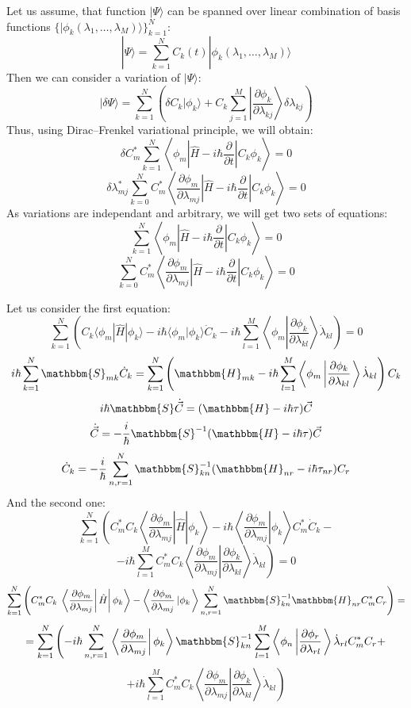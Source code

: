 Let us assume, that function $|\Psi\rangle$ can be spanned over linear combination of basis functions $\{|\phi_k(\lambda_1,\ldots,\lambda_M)\rangle\}_{k=1}^N$:
$$|\Psi\rangle = \sum_{k=1}^NC_k(t)|\phi_k(\lambda_1,\ldots,\lambda_M)\rangle$$
Then we can consider a variation of $|\Psi\rangle$:
$$|\delta\Psi\rangle = \sum_{k=1}^N \left( \delta C_k|\phi_k\rangle + %
					   C_k\sum_{j=1}^M\left|\frac{\partial\phi_k}{\partial\lambda_{kj}}\right\rangle\delta\lambda_{kj} \right)$$
Thus, using Dirac--Frenkel variational principle, we will obtain:
$$\delta C_m^*\sum_{k=1}^N\left\langle\phi_m\left|\hat{H}-i\hbar\frac{\partial}{\partial t}\right|C_k\phi_k\right\rangle=0$$
$$\delta\lambda_{mj}^*\sum_{k=0}^NC_m^*\left\langle\frac{\partial\phi_m}{\partial\lambda_{mj}}\left|\hat{H}-i\hbar\frac{\partial}{\partial t}\right|C_k\phi_k\right\rangle = 0$$
As variations are independant and arbitrary, we will get two sets of equations:
$$\sum_{k=1}^N\left\langle\phi_m\left|\hat{H}-i\hbar\frac{\partial}{\partial t}\right|C_k\phi_k\right\rangle=0$$
$$\sum_{k=0}^NC_m^*\left\langle\frac{\partial\phi_m}{\partial\lambda_{mj}}\left|\hat{H}-i\hbar\frac{\partial}{\partial t}\right|C_k\phi_k\right\rangle = 0$$

Let us consider the first equation:
$$\sum_{k=1}^N \left(C_k\langle\phi_m|\hat{H}|\phi_k\rangle - %
	       i\hbar\langle\phi_m|\phi_k\rangle \dot{C}_k - %
	       i\hbar\sum_{l=1}^M\left\langle\phi_m\left|\frac{\partial\phi_k}{\partial\lambda_{kl}}\right.\right\rangle\dot{\lambda}_{kl}\right)=0$$
$$i\hbar\sum_{k=1}^N\mathbbm{S}_{mk}\dot{C}_k=\sum_{k=1}^N\left(\mathbbm{H}_{mk}-%
							  i\hbar\sum_{l=1}^M\left\langle\phi_m\left|\frac{\partial\phi_k}{\partial\lambda_{kl}}\right.\right\rangle\dot{\lambda}_{kl}\right)C_k$$
$$i\hbar\mathbbm{S}\dot{\vec{C}}=(\mathbbm{H}-i\hbar\tau)\vec{C}$$
$$\dot{\vec{C}} = -\frac{i}{\hbar}\mathbbm{S}^{-1}(\mathbbm{H}-i\hbar\tau)\vec{C}$$
$$\dot{C}_k = -\frac{i}{\hbar}\sum_{n,r=1}^N \mathbbm{S}^{-1}_{kn}(\mathbbm{H}_{nr}-i\hbar\tau_{nr})C_r$$
And the second one:
$$\sum_{k=1}^N\left.\left.\left(C_m^*C_k\left\langle\frac{\partial\phi_m}{\partial\lambda_{mj}}\right|\hat{H}\right|\phi_k\right\rangle-%
	     i\hbar\left.\left\langle\frac{\partial\phi_m}{\partial\lambda_{mj}}\right|\phi_k\right\rangle C_m^*\dot{C}_k-\right.$$
$$\left.    -i\hbar\sum_{l=1}^MC_m^*C_k\left\langle\frac{\partial\phi_m}{\partial\lambda_{mj}}\left|\frac{\partial\phi_k}{\partial\lambda_{kl}}\right.\right\rangle\dot{\lambda}_{kl}\right)=0$$
$$\sum_{k=1}^N\left(C_m^*C_k\left.\left.\left\langle\frac{\partial\phi_m}{\partial\lambda_{mj}}\right|\hat{H}\right|\phi_k\right\rangle-%
		    \left\langle\frac{\partial\phi_m}{\partial\lambda_{mj}}\left|\phi_k\right.\right\rangle\sum_{n,r=1}^N\mathbbm{S}^{-1}_{kn}\mathbbm{H}_{nr}C_m^*C_r\right)=$$
$$= \sum_{k=1}^N\left(-i\hbar\sum_{n,r=1}^N\left.\left\langle\frac{\partial\phi_m}{\partial\lambda_{mj}}\right|\phi_k\right\rangle\mathbbm{S}_{kn}^{-1}%
		             \sum_{l=1}^M\left\langle\phi_n\left|\frac{\partial\phi_r}{\partial\lambda_{rl}}\right.\right\rangle\dot{\lambda}_{rl}C_m^*C_r+\right.$$
$$\left.     +i\hbar\sum_{l=1}^MC_m^*C_k\left\langle\frac{\partial\phi_m}{\partial\lambda_{mj}}\left|\frac{\partial\phi_k}{\partial\lambda_{kl}}\right.\right\rangle\dot{\lambda}_{kl}\right)$$

